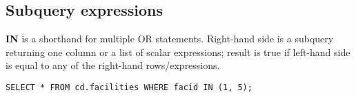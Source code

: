 %

\color{black}
\subsection{Subquery expressions}
\textbf{IN} is a shorthand for multiple OR statements.
Right-hand side is a subquery returning one column or a list of scalar expressions; result is true if left-hand side is equal to any of the right-hand rows/expressions.
\begin{verbatim}
SELECT * FROM cd.facilities WHERE facid IN (1, 5);
\end{verbatim}

%